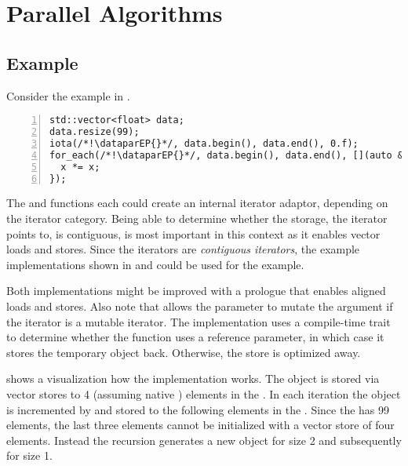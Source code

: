\section{Parallel Algorithms}

\subsection{Example}
Consider the example in .
\begin{lstlisting}[style=Vc,numbers=left,float,label=lst:datapar foreach,caption={
  Example using \dataparEP with \code{iota} and \code{for_each}.
}]
std::vector<float> data;
data.resize(99);
iota(/*!\dataparEP{}*/, data.begin(), data.end(), 0.f);
for_each(/*!\dataparEP{}*/, data.begin(), data.end(), [](auto &x) {
  x *= x;
});
\end{lstlisting}
The  and  functions each could create an internal \datapar iterator adaptor, depending on the iterator category.
Being able to determine whether the storage, the iterator points to, is contiguous, is most important in this context as it enables vector loads and stores.
Since the \std{} iterators are \emph{contiguous iterators}, the example implementations shown in  and  could be used for the example.



Both implementations might be improved with a prologue that enables aligned loads and stores.
Also note that  allows the  parameter to mutate the argument if the iterator is a mutable iterator.
The implementation uses a compile-time trait to determine whether the function  uses a reference parameter, in which case it stores the temporary \datapar object back.
Otherwise, the store is optimized away.

 shows a visualization how the  implementation works.
The  \datapar object is stored via vector stores to 4 (assuming native \datapar[::size() == 4]) elements in the \std{}.
In each iteration the  object is incremented by \datapar[::size()] and stored to the following elements in the \std{}.
Since the \std{} has 99 elements, the last three elements cannot be initialized with a vector store of four elements.
Instead the  recursion generates a new  \datapar object for size 2 and subsequently for size 1.

